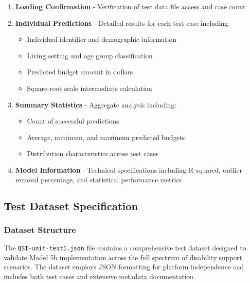 \begin{enumerate}
    \item \textbf{Loading Confirmation} - Verification of test data file access and case count
    \item \textbf{Individual Predictions} - Detailed results for each test case including:
        \begin{itemize}
            \item Individual identifier and demographic information
            \item Living setting and age group classification
            \item Predicted budget amount in dollars
            \item Square-root scale intermediate calculation
        \end{itemize}
    \item \textbf{Summary Statistics} - Aggregate analysis including:
        \begin{itemize}
            \item Count of successful predictions
            \item Average, minimum, and maximum predicted budgets
            \item Distribution characteristics across test cases
        \end{itemize}
    \item \textbf{Model Information} - Technical specifications including R-squared, outlier removal percentage, and statistical performance metrics
\end{enumerate}

\subsection{Test Dataset Specification}

\subsubsection{Dataset Structure}

The \texttt{QSI-unit-test1.json} file contains a comprehensive test dataset designed to validate Model 5b implementation across the full spectrum of disability support scenarios. The dataset employs JSON formatting for platform independence and includes both test cases and extensive metadata documentation.


